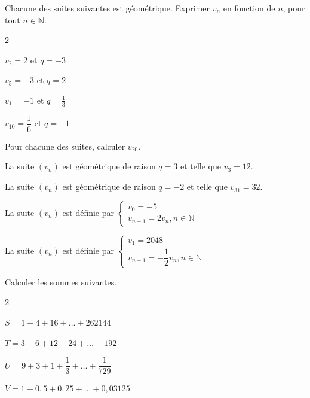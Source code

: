 \documentclass[11pt,a4paper]{article}  %
\begin{document}
Chacune des suites suivantes est géométrique. Exprimer $v_n$ en fonction de $n$, pour tout $n \in \mathbb{N}$.
\begin{multicols}{2}
	\begin{enumMet}
	\item $v_2=2$ et $q=-3$
	\item $v_5=-3$ et $q=2$
	\item $v_1=-1$ et $q=\frac{1}{3}$
	\item $v_{10}=\dfrac{1}{6}$ et $q=-1$
\end{enumMet}
\end{multicols}

Pour chacune des suites, calculer $v_{20}$.
\begin{enumMet}
	\item La suite $\left(v_n\right)$ est géométrique de raison $q=3$ et telle que $v_3=12$.
	\item La suite $\left(v_n\right)$ est géométrique de raison $q=-2$ et telle que $v_{31}=32$.
	\item La suite $\left(v_n\right)$ est définie par $\left\{\begin{array}{l}v_0=-5 \\ v_{n+1}=2 v_n, n \in \mathbb{N}\end{array}\right.$
	\item La suite $\left(v_n\right)$ est définie par $\left\{\begin{array}{l}v_1=2048 \\ v_{n+1}=-\dfrac{1}{2} v_n, n \in \mathbb{N}\end{array}\right.$
\end{enumMet}

Calculer les sommes suivantes.
\begin{multicols}{2}
	\begin{enumMet}
	\item $S=1+4+16+\ldots+262144$
	\item $T=3-6+12-24+\ldots+192$
	\item $U=9+3+1+\dfrac{1}{3}+\ldots+\dfrac{1}{729}$
	\item $V=1+0,5+0,25+\ldots+0,03125$
\end{enumMet}
\end{multicols}

\end{document}
